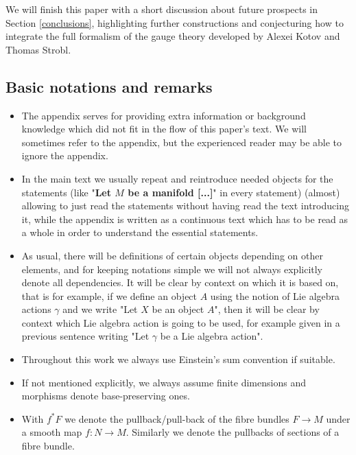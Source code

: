 \documentclass[a4paper,oneside,11pt,bibliography=totoc]{scrartcl}
\theoremstyle{plain}
\theoremstyle{remark}
\theoremstyle{definition}
\begin{document}
 We will finish this paper with a short discussion about future prospects in Section \ref{conclusions}, highlighting further constructions and conjecturing how to integrate the full formalism of the gauge theory developed by Alexei Kotov and Thomas Strobl.

\subsection{Basic notations and remarks}\label{BasicNotations}

\begin{itemize}
	\item The appendix serves for providing extra information or background knowledge which did not fit in the flow of this paper's text. We will sometimes refer to the appendix, but the experienced reader may be able to ignore the appendix. 
	\item In the main text we usually repeat and reintroduce needed objects for the statements (like "\textbf{Let $M$ be a manifold [...]}" in every statement) (almost) allowing to just read the statements without having read the text introducing it, while the appendix is written as a continuous text which has to be read as a whole in order to understand the essential statements.
	\item As usual, there will be definitions of certain objects depending on other elements, and for keeping notations simple we will not always explicitly denote all dependencies. It will be clear by context on which it is based on, that is for example, if we define an object $A$ using the notion of Lie algebra actions $\gamma$ and we write "Let $X$ be an object $A$", then it will be clear by context which Lie algebra action is going to be used, for example given in a previous sentence writing "Let $\gamma$ be a Lie algebra action".
	\item Throughout this work we always use Einstein's sum convention if suitable.
	\item If not mentioned explicitly, we always assume finite dimensions and morphisms denote base-preserving ones.
	\item With $f^*F$ we denote the pullback/pull-back of the fibre bundles $F \to M$ under a smooth map $f: N \to M$. Similarly we denote the pullbacks of sections of a fibre bundle.

\end{itemize}
\end{document}
